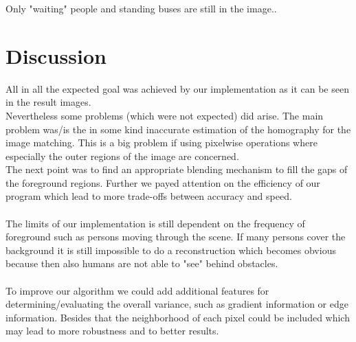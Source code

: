 Only "waiting" people and standing buses are still in the image..

\chapter{Discussion}

All in all the expected goal was achieved by our implementation as it can be seen in the result images.\\
Nevertheless some problems (which were not expected) did arise. The main problem was/is the in some kind inaccurate estimation of the homography for the image matching. This is a big problem if using pixelwise operations where especially the outer regions of the image are concerned.\\
The next point was to find an appropriate blending mechanism to fill the gaps of the foreground regions. Further we payed attention on the efficiency of our program which lead to more trade-offs between accuracy and speed.\\\\

The limits of our implementation is still dependent on the frequency of foreground such as persons moving through the scene. If many persons cover the background it is still impossible to do a reconstruction which becomes obvious because then also humans are not able to "see" behind obstacles.\\\\

To improve our algorithm we could add additional features for determining/evaluating the overall variance, such as gradient information or edge information. Besides that the neighborhood of each pixel could be included which may lead to more robustness and to better results.


